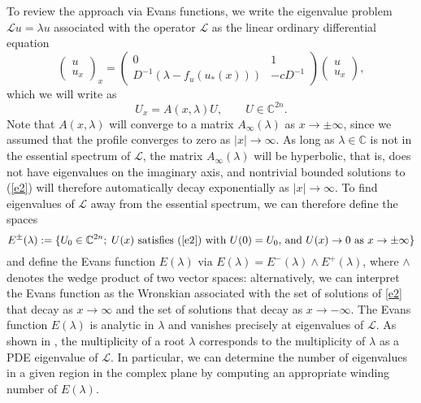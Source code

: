 \documentclass[10pt]{article}
\numberwithin{equation}{section}
\newcommand{\C}{\mathbb{C}}
\begin{document}
To review the approach via Evans functions, we write the eigenvalue problem $\mathcal{L}u=\lambda u$ associated with the operator $\mathcal{L}$ as the linear ordinary differential equation
\[
\begin{pmatrix} u\\ u_x \end{pmatrix}_x = \begin{pmatrix} 0 & 1 \\ D^{-1}(\lambda-f_u(u_*(x))) & -cD^{-1} \end{pmatrix}
\begin{pmatrix} u\\ u_x \end{pmatrix},
\]
which we will write as
\begin{equation}\label{e2}
U_x = A(x,\lambda) U, \qquad U\in\C^{2n}.
\end{equation}
Note that $A(x,\lambda)$ will converge to a matrix $A_\infty(\lambda)$ as $x\to\pm\infty$, since we assumed that the profile converges to zero as $|x|\to\infty$. As long as $\lambda\in\C$ is not in the essential spectrum of $\mathcal{L}$, the matrix $A_\infty(\lambda)$ will be hyperbolic, that is, does not have eigenvalues on the imaginary axis, and nontrivial bounded solutions to (\ref{e2}) will therefore automatically decay exponentially as $|x|\to\infty$. To find eigenvalues of $\mathcal{L}$ away from the essential spectrum, we can therefore define the spaces
\[
E^\pm(\lambda) := \{ U_0\in\C^{2n};\; U(x) \mbox{ satisfies (\ref{e2}) with } U(0)=U_0 \mbox{, and } U(x)\to0  \mbox{ as }x\to\pm\infty \}
\]
and define the Evans function $E(\lambda)$ via $E(\lambda)=E^-(\lambda)\wedge E^+(\lambda)$, where $\wedge$ denotes the wedge product of two vector spaces: alternatively, we can interpret the Evans function as the Wronskian associated with the set of solutions of \eqref{e2} that decay as $x\to\infty$ and the set of solutions that decay as $x\to-\infty$. The Evans function $E(\lambda)$ is analytic in $\lambda$ and vanishes precisely at eigenvalues of $\mathcal{L}$. As shown in \citep{AGJ}, the multiplicity of a root $\lambda$ corresponds to the multiplicity of $\lambda$ as a PDE eigenvalue of $\mathcal{L}$. In particular, we can determine the number of eigenvalues in a given region in the complex plane by computing an appropriate winding number of $E(\lambda)$.
\end{document}
